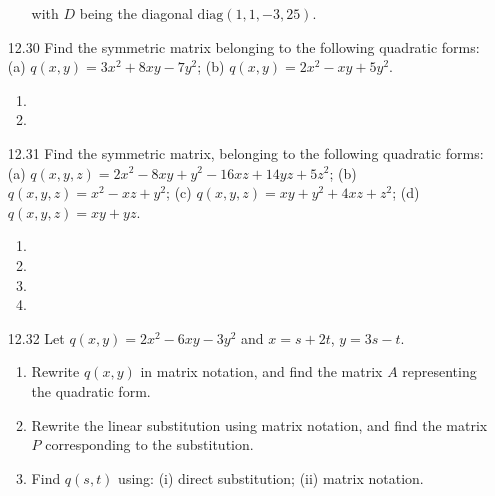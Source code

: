 \documentclass[12pt]{article}
\theoremstyle{definition}
\theoremstyle{plain}
\begin{document}
\begin{enumerate}
\begin{enumerate}
	with $D$ being the diagonal $\mathrm{diag}(1,1,-3,25)$.
	\end{enumerate}		
\item[12.30]Find the symmetric matrix belonging to the following quadratic forms: (a) $q(x,y)=3x^2+8xy-7y^2$; (b) $q(x,y)=2x^2-xy+5y^2$.
	\begin{enumerate}
	\item
	\item
	\end{enumerate}		
\item[12.31]Find the symmetric matrix, belonging to the following quadratic forms:\\
(a) $q(x,y,z)=2x^2-8xy+y^2-16xz+14yz+5z^2$; (b) $q(x,y,z)=x^2-xz+y^2$; (c) $q(x,y,z)=xy+y^2+4xz+z^2$; (d) $q(x,y,z)=xy+yz$.
	\begin{enumerate}
	\item
	\item
	\item
	\item
	\end{enumerate}		
\item[12.32]Let $q(x,y)=2x^2-6xy-3y^2$ and $x=s+2t$, $y=3s-t$.
	\begin{enumerate}
	\item Rewrite $q(x,y)$ in matrix notation, and find the matrix $A$ representing the quadratic form.
	\item Rewrite the linear substitution using matrix notation, and find the matrix $P$ corresponding to the substitution.
	\item Find $q(s,t)$ using: (i) direct substitution; (ii) matrix notation.
	\end{enumerate}		
	
\end{enumerate}	
\end{document}
